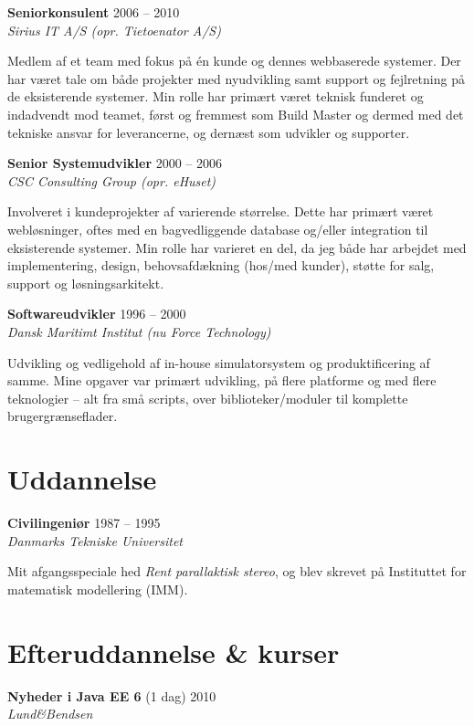 \documentclass[a4paper,11pt]{article}
\begin{document}
\smallskip

\textbf{Seniorkonsulent} \hfill 2006 -- 2010 \\
\textsl{Sirius IT A/S (opr. Tietoenator A/S)}

Medlem af et team med fokus på én kunde og dennes webbaserede
systemer. Der har været tale om både projekter med nyudvikling samt
support og fejlretning på de eksisterende systemer. Min rolle har
primært været teknisk funderet og indadvendt mod teamet, først og
fremmest som Build Master og dermed med det tekniske ansvar for
leverancerne, og dernæst som udvikler og supporter.

\smallskip

\textbf{Senior Systemudvikler} \hfill 2000 -- 2006 \\
\textsl{CSC Consulting Group (opr. eHuset)}

Involveret i kundeprojekter af varierende størrelse. Dette har primært
været webløsninger, oftes med en bagvedliggende database og/eller
integration til eksisterende systemer. Min rolle har varieret en del,
da jeg både har arbejdet med implementering, design, behovsafdækning
(hos/med kunder), støtte for salg, support og løsningsarkitekt.

\smallskip

\textbf{Softwareudvikler} \hfill 1996 -- 2000 \\
\textsl{Dansk Maritimt Institut (nu Force Technology)}

Udvikling og vedligehold af in-house simulatorsystem og
produktificering af samme. Mine opgaver var primært udvikling, på
flere platforme og med flere teknologier – alt fra små scripts, over
biblioteker/moduler til komplette brugergrænseflader.


\section*{Uddannelse}

\textbf{Civilingeniør} \hfill 1987 -- 1995 \\
\textsl{Danmarks Tekniske Universitet}

Mit afgangsspeciale hed \textit{Rent parallaktisk stereo}, og blev
skrevet på Instituttet for matematisk modellering (IMM).


\section*{Efteruddannelse \& kurser}

\textbf{Nyheder i Java EE 6} \hfill (1 dag) 2010 \\
\textsl{Lund\&Bendsen}
\end{document}
